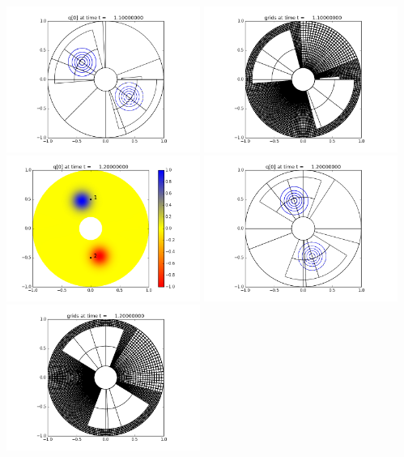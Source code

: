 \documentclass[11pt]{article}
\begin{document}
\includegraphics[width=0.475\textwidth]{frame0011fig1.png}
\vskip 10pt 
\includegraphics[width=0.475\textwidth]{frame0011fig2.png}
\vskip 10pt 
\includegraphics[width=0.475\textwidth]{frame0012fig0.png}
\includegraphics[width=0.475\textwidth]{frame0012fig1.png}
\vskip 10pt 
\includegraphics[width=0.475\textwidth]{frame0012fig2.png}
\end{document}
